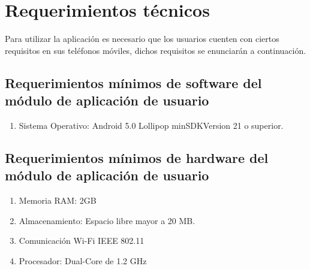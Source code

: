 \section{Requerimientos técnicos}
Para utilizar la aplicación es necesario que los usuarios cuenten con ciertos requisitos en sus teléfonos móviles, dichos requisitos se enunciarán a continuación.
\subsection{Requerimientos mínimos de software del módulo de aplicación de usuario}
\begin{enumerate}
	\item Sistema Operativo: Android 5.0 Lollipop minSDKVersion 21 o superior.
\end{enumerate}
\subsection{Requerimientos mínimos de hardware del módulo de aplicación de usuario}
\begin{enumerate}
	\item Memoria RAM: 2GB
	\item Almacenamiento: Espacio libre mayor a 20 MB.
	\item Comunicación Wi-Fi IEEE 802.11 
	\item Procesador: Dual-Core de 1.2 GHz
\end{enumerate}